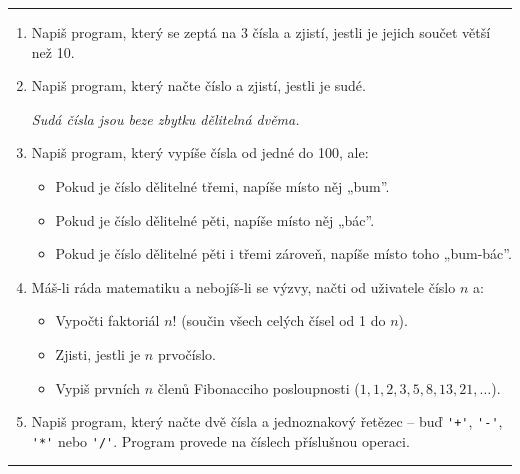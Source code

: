 \documentclass[a4paper,10pt]{article}
\begin{document}
\hrule

\begin{enumerate}[resume]

\item Napiš program, který se zeptá na 3 čísla
    a zjistí, jestli je jejich součet větší než 10.

\item Napiš program, který načte číslo a zjistí, jestli je sudé.

    \emph{\small Sudá čísla jsou beze \emph{zbytku} dělitelná dvěma.}

\item Napiš program, který vypíše čísla od jedné do 100, ale:
    \begin{itemize}
        \item Pokud je číslo dělitelné třemi, napíše místo něj „bum”.
        \item Pokud je číslo dělitelné pěti, napíše místo něj „bác”.
        \item Pokud je číslo dělitelné pěti i třemi zároveň, napíše místo toho „bum-bác”.
    \end{itemize}

\item Máš-li ráda matematiku a nebojíš-li se výzvy, načti od uživatele číslo $n$ a:
    \begin{itemize}
        \item Vypočti faktoriál $n!$ (součin všech celých čísel od 1 do $n$).
        \item Zjisti, jestli je $n$ prvočíslo.
        \item Vypiš prvních $n$ členů Fibonacciho posloupnosti ($1, 1, 2, 3, 5, 8, 13, 21, \ldots $).
    \end{itemize}

\item Napiš program, který načte dvě čísla a jednoznakový řetězec
    – buď \verb!'+'!, \verb!'-'!, \verb!'*'! nebo \verb!'/'!.
    Program provede na číslech příslušnou operaci.

\end{enumerate}

\hrule
\end{document}
